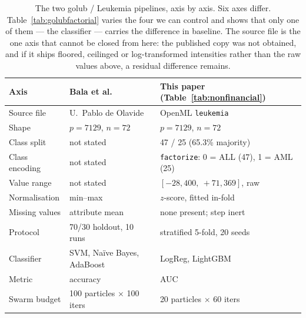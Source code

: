 \begin{table}[htbp]
    \centering
    \small\setlength{\tabcolsep}{5pt}
    \begin{tabular}{lll}
    \hline
    Axis & Bala et al.~\cite{bala2025orpsoc} & This paper (Table~\ref{tab:nonfinancial}) \\
    \hline
    Source file        & U.\ Pablo de Olavide       & OpenML \texttt{leukemia} \\
    Shape              & $p = 7129$, $n = 72$       & $p = 7129$, $n = 72$ \\
    Class split        & not stated                 & 47 / 25 (65.3\% majority) \\
    Class encoding     & not stated                 & \texttt{factorize}: 0 = ALL (47), 1 = AML (25) \\
    Value range        & not stated                 & $[-28{,}400,\ +71{,}369]$, raw \\
    Normalisation      & min--max                   & $z$-score, fitted in-fold \\
    Missing values     & attribute mean             & none present; step inert \\
    Protocol           & 70/30 holdout, 10 runs     & stratified 5-fold, 20 seeds \\
    Classifier         & SVM, Na\"ive Bayes, AdaBoost & LogReg, LightGBM \\
    Metric             & accuracy                   & AUC \\
    Swarm budget       & 100 particles $\times$ 100 iters & 20 particles $\times$ 60 iters \\
    \hline
    \end{tabular}
    \caption{The two golub / Leukemia pipelines, axis by axis. Six axes differ.
    Table~\ref{tab:golubfactorial} varies the four we can control and shows that
    only one of them --- the classifier --- carries the difference in baseline.
    The source file is the one axis that cannot be closed from here: the
    published copy was not obtained, and if it ships floored, ceilinged or
    log-transformed intensities rather than the raw values above, a residual
    difference remains.}
    \label{tab:golubpipelines}
\end{table}
